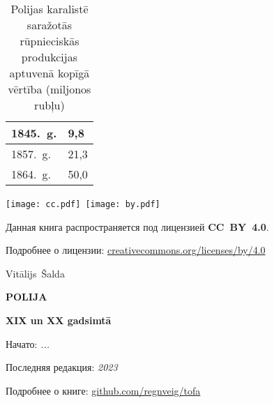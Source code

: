 \documentclass[twoside,a5paper,12pt,fleqn,openany]{extbook}
\newcommand{\ml}[3]{#2}
\newcommand{\bookauthor}{Vitālijs~Šalda}
\newcommand{\bookstarted}{...}
\newcommand{\bookfinished}{2023}
\begin{document}

\noindent
\begin{table}[h!]
\caption{Polijas karalistē saražotās rūpnieciskās produkcijas aptuvenā kopīgā vērtība (miljonos rubļu)} \label{tab:table2}
\begin{tabularx}{\linewidth}{|p{4cm}|p{4cm}|}
\hline
1845.~g. & 9,8 \\
\hline
1857.~g. & 21,3 \\
\hline
1864.~g. & 50,0 \\
\hline
\end{tabularx}
\end{table}




\newpage\thispagestyle{plain}
{\centering

\texttt{[image: cc.pdf]}~\texttt{[image: by.pdf]}

\vspace{0.2em}

{\ml{$0$}{Данная книга распространяется под лицензией \textbf{CC~BY~4.0}.}{This book is distributed under the \textbf{CC~BY~4.0} license.}\par}
{\ml{$0$}{Подробнее о лицензии:}{Details:} \href{https://creativecommons.org/licenses/by/4.0/deed.ru}{creativecommons.org/licenses/by/4.0}\par}

\vfill

{\large\bookauthor\par}
\vspace{0.5em}
{\Huge\textbf{POLIJA}\par}
{\Large\textbf{XIX un XX gadsimtā}\par}

\vfill

{\ml{$0$}{Начато:}{Started:} \textit{\bookstarted}\par}
{\ml{$0$}{Последняя редакция:}{Latest revision:} \textit{\bookfinished}\par}
{\ml{$0$}{Подробнее о книге:}{The book details:} \href{https://github.com/regnveig/tofa}{github.com/regnveig/tofa}\par}

\vfill

}
\end{document}
